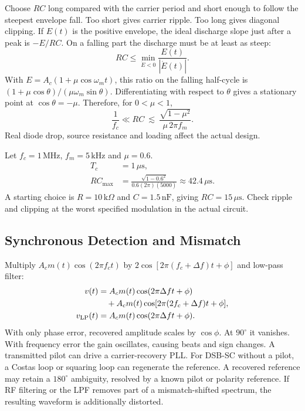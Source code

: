 \documentclass[12pt,a4paper]{article}
\begin{document}
Choose $RC$ long compared with the carrier period and short enough to follow the steepest envelope fall. Too short gives carrier ripple. Too long gives diagonal clipping. If $E(t)$ is the positive envelope, the ideal discharge slope just after a peak is $-E/RC$. On a falling part the discharge must be at least as steep:
\[
 RC\le \min_{\dot E<0}\frac{E(t)}{|\dot E(t)|}.
\]
With $E=A_c(1+\mu\cos\omega_mt)$, this ratio on the falling half-cycle is $(1+\mu\cos\theta)/(\mu\omega_m\sin\theta)$. Differentiating with respect to $\theta$ gives a stationary point at $\cos\theta=-\mu$. Therefore, for $0<\mu<1$,
\[
 \frac{1}{f_c}\ll RC
 \ \lesssim\ \frac{\sqrt{1-\mu^2}}{\mu\,2\pi f_m}.
\]
Real diode drop, source resistance and loading affect the actual design.

\begin{tcolorbox}[examplebox, title={Select a Detector Time Constant}]
Let $f_c=1\,\mathrm{MHz}$, $f_m=5\,\mathrm{kHz}$ and $\mu=0.6$.
\[
\begin{aligned}
 T_c &=1\,\mu\mathrm{s},\\
 RC_{\max}&=\frac{\sqrt{1-0.6^2}}{0.6(2\pi)(5000)}
            \approx42.4\,\mu\mathrm{s}.
\end{aligned}
\]
A starting choice is $R=10\,\mathrm{k}\Omega$ and $C=1.5\,\mathrm{nF}$, giving $RC=15\,\mu\mathrm{s}$. Check ripple and clipping at the worst specified modulation in the actual circuit.
\end{tcolorbox}

\subsection{Synchronous Detection and Mismatch}
Multiply $A_cm(t)\cos(2\pi f_ct)$ by $2\cos[2\pi(f_c+\Delta f)t+\phi]$ and low-pass filter:
\[
\begin{aligned}
 v(t)&=A_cm(t)\cos(2\pi\Delta ft+\phi)\\
     &\quad+A_cm(t)\cos[2\pi(2f_c+\Delta f)t+\phi],\\
 v_{\rm LP}(t)&=A_cm(t)\cos(2\pi\Delta ft+\phi).
\end{aligned}
\]
With only phase error, recovered amplitude scales by $\cos\phi$. At $90^\circ$ it vanishes. With frequency error the gain oscillates, causing beats and sign changes. A transmitted pilot can drive a carrier-recovery PLL. For DSB-SC without a pilot, a Costas loop or squaring loop can regenerate the reference. A recovered reference may retain a $180^\circ$ ambiguity, resolved by a known pilot or polarity reference. If RF filtering or the LPF removes part of a mismatch-shifted spectrum, the resulting waveform is additionally distorted.
\end{document}
